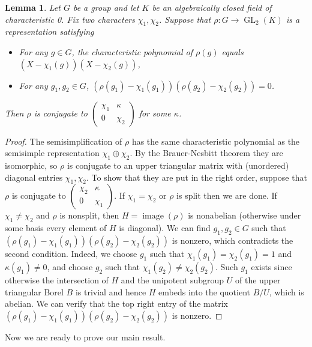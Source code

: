 \documentclass[10pt]{article}
\newtheorem{lemma}[theorem]{Lemma}
\theoremstyle{definition}
\numberwithin{equation}{theorem}
\DeclareMathOperator{\GL}{GL}
\DeclareMathOperator{\image}{image}
\begin{document}
\begin{lemma}\label{BrauerNesbitt}
Let $G$ be a group and let $K$ be an algebraically closed field of characteristic 0. Fix two characters $\chi_1,\chi_2$. Suppose that $\rho:G\to\GL_2(K)$ is a representation satisfying
\begin{itemize}
    \item For any $g\in G$, the characteristic polynomial of $\rho(g)$ equals $(X-\chi_1(g))(X-\chi_2(g))$,
    \item For any $g_1, g_2\in G$, $(\rho(g_1)-\chi_1(g_1))(\rho(g_2)-\chi_2(g_2))=0$.
\end{itemize}
Then $\rho$ is conjugate to $\left(\begin{array}{cc}
    \chi_1 & \kappa \\
    0 & \chi_2
    \end{array}\right)$ for some $\kappa$.
\end{lemma}

\begin{proof}
The semisimplification of $\rho$ has the same characteristic polynomial as the semisimple representation $\chi_1\oplus\chi_2$. By the Brauer-Nesbitt theorem they are isomorphic, so $\rho$ is conjugate to an upper triangular matrix with (unordered) diagonal entries $\chi_1,\chi_2$. To show that they are put in the right order, suppose that $\rho$ is conjugate to $\left(\begin{array}{cc}
    \chi_2 & \kappa \\
    0 & \chi_1
    \end{array}\right)$.
If $\chi_1=\chi_2$ or $\rho$ is split then we are done. If $\chi_1\ne\chi_2$ and $\rho$ is nonsplit, then $H=\image(\rho)$ is nonabelian (otherwise under some basis every element of $H$ is diagonal). We can find $g_1,g_2\in G$ such that $(\rho(g_1)-\chi_1(g_1))(\rho(g_2)-\chi_2(g_2))$ is nonzero, which contradicts the second condition. Indeed, we choose $g_1$ such that $\chi_1(g_1)=\chi_2(g_1)=1$ and $\kappa(g_1)\ne0$, and choose $g_2$ such that $\chi_1(g_2)\ne\chi_2(g_2)$. Such $g_1$ exists since otherwise the intersection of $H$ and the unipotent subgroup $U$ of the upper triangular Borel $B$ is trivial and hence $H$ embeds into the quotient $B/U$, which is abelian. We can verify that the top right entry of the matrix $(\rho(g_1)-\chi_1(g_1))(\rho(g_2)-\chi_2(g_2))$ is nonzero.
\end{proof}

Now we are ready to prove our main result.
\end{document}
